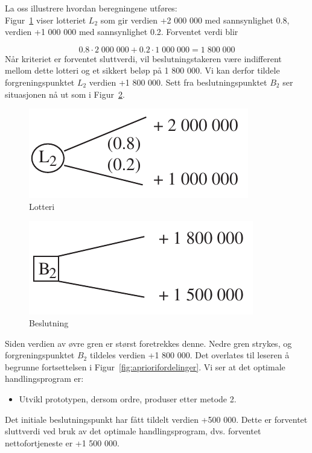 {{La oss illustrere hvordan beregningene utføres:\\
Figur~\ref{fig:lotteri} viser lotteriet $L_2$ som gir verdien +2 000 000 med sannsynlighet
0.8, verdien +1 000 000 med sannsynlighet 0.2.  Forventet verdi blir

       \[   0.8\cdot 2\;000\;000 + 0.2\cdot 1\;000\;000 = 1\;800\;000     \]
Når kriteriet er forventet sluttverdi, vil beslutningstakeren være
indifferent mellom dette lotteri og et sikkert beløp på
1 800 000. Vi kan derfor tildele forgreningspunktet $L_2$ verdien 
+1 800 000. Sett fra beslutningspunktet $B_2$ ser situasjonen nå ut 
som i Figur~\ref{fig:beslutning}.  
\begin{figure}[ht]
\centering
	\includegraphics[scale=1.0]{figurer/fig16_4.pdf} 
\caption{Lotteri}
	\label{fig:lotteri}
\end{figure}
\begin{figure}[ht]
\centering
	\includegraphics[scale=1.0]{figurer/fig16_5.pdf} 
\caption{Beslutning}
	\label{fig:beslutning}
\end{figure}


Siden verdien av øvre gren er størst foretrekkes denne.  Nedre gren
strykes, og forgreningspunktet $B_2$ tildeles verdien +1 800 000.  Det
overlates til leseren å begrunne fortsettelsen i Figur~\ref{fig:apriorifordelinger}.  Vi ser at
det optimale hand\-lings\-program er:

\begin{itemize}
\item Utvikl prototypen, dersom ordre, produser etter metode 2.
\end{itemize}
Det initiale beslutningspunkt har fått tildelt verdien
+500 000.  Dette er forventet sluttverdi ved bruk av det optimale 
handlingsprogram, dvs. forventet nettofortjeneste er +1 500 000.

}}
